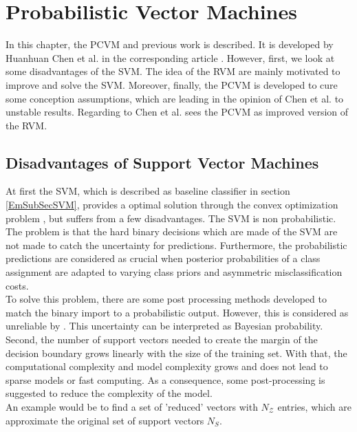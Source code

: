 \chapter{Probabilistic Vector Machines}\label{Pc}
In this chapter, the \ac{PCVM} and previous work is described.
It is developed by Huanhuan Chen et al. in the corresponding article \cite{Chen.2009}. 
However, first, we look at some disadvantages of the \ac{SVM}.
The idea of the \acs{RVM} are mainly motivated to improve and solve the \acs{SVM}.\cite[p. 1-2]{Tipping.2001}
Moreover, finally, the \acs{PCVM} is developed to cure some conception assumptions, which are leading in the opinion of Chen et al. to unstable results.
Regarding to Chen et al. sees the \acs{PCVM} as improved version of the \acs{RVM}.\cite{Chen.2009}\newline
\section{Disadvantages of Support Vector Machines}\label{PcSecIdea}
At first the \acs{SVM}, which is described as baseline classifier in section \ref{EmSubSecSVM}, provides a optimal solution through the convex optimization problem \cite[p. 325]{Bishop.2009}, but suffers from a few disadvantages.\newline
The \acs{SVM} is non probabilistic.
The problem is that the hard binary decisions which are made of the \acs{SVM} are not made to catch the uncertainty for predictions.
Furthermore, the probabilistic predictions are considered as crucial when posterior probabilities of a class assignment are adapted to varying class priors and asymmetric misclassification costs.\cite[p. 239-240]{Tipping.2001}\\
To solve this problem, there are some post processing methods developed to match the binary import to a probabilistic output.
However, this is considered as unreliable by \cite[p. 239-240]{Tipping.2001}. 
This uncertainty can be interpreted as Bayesian probability.\cite[p. 21]{Bishop.2009}\newline 
Second, the number of support vectors needed to create the margin of the decision boundary grows linearly with the size of the training set.
With that, the computational complexity and model complexity grows and does not lead to sparse models or fast computing.
As a consequence, some post-processing is suggested to reduce the complexity of the model.\cite{Chen.2009}\\
An example would be to find a set of 'reduced' vectors with $N_\mathcal{Z}$ entries, which are approximate the original set of support vectors $N_S$.
